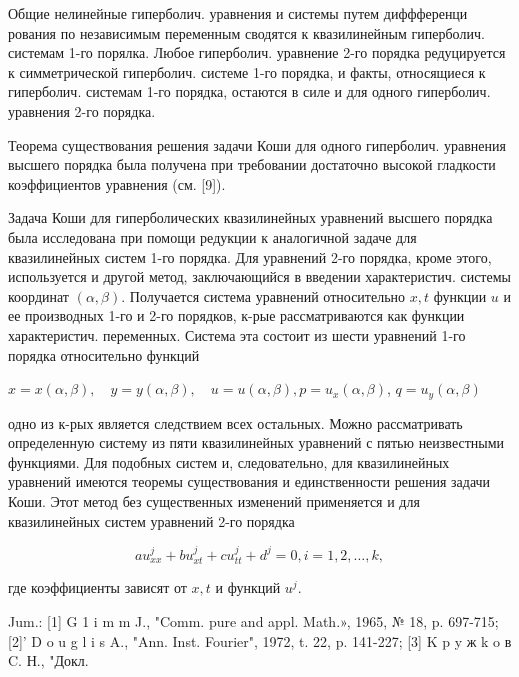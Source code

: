\documentclass[10pt]{article}
\begin{document}
Общие нелинейные гиперболич. уравнения и системы путем диффференци рования по независимым переменным сводятся к квазилинейным гиперболич. системам 1-го порялка. Любое гиперболич. уравнение 2-го порядка редуцируется к симметрической гиперболич. системе 1-го порядка, и факты, относящиеся к гиперболич. системам 1-го порядка, остаются в силе и для одного гиперболич. уравнения 2-го порядка.



Теорема существования решения задачи Коши для одного гиперболич. уравнения высшего порядка была получена при требовании достаточно высокой гладкости коэффициентов уравнения (см. [9]).



Задача Коши для гиперболических квазилинейных уравнений высшего порядка была исследована при помощи редукции к аналогичной задаче для квазилинейных систем 1-го порядка. Для уравнений 2-го порядка, кроме этого, используется и другой метод, заключающийся в введении характеристич. системы координат $(\alpha, \beta)$. Получается система уравнений относительно $x, t$ функции $u$ и ее производных 1-го и 2-го порядков, к-рые рассматриваются как функции характеристич. переменных. Система эта состоит из шести уравнений 1-го порядка относительно функций



$x=x(\alpha, \beta), \quad y=y(\alpha, \beta), \quad u=u(\alpha, \beta), p=u_{x}(\alpha, \beta)$, $q=u_{y}(\alpha, \beta)$



одно из к-рых является следствием всех остальных. Можно рассматривать определенную систему из пяти квазилинейных уравнений с пятью неизвестными функциями. Для подобных систем и, следовательно, для квазилинейных уравнений имеются теоремы существования и единственности решения задачи Коши. Этот метод без существенных изменений применяется и для квазилинейных систем уравнений 2-го порядка



\[

a u_{x x}^{j}+b u_{x t}^{j}+c u_{t t}^{j}+d^{j}=0, i=1,2, \ldots, k,

\]



где коэффициенты зависят от $x, t$ и функций $u^{j}$.



Jum.: [1] G 1 i m m J., "Comm. pure and appl. Math.», 1965, № 18, p. 697-715; [2]' D o u g l i s A., "Ann. Inst. Fourier", 1972, t. 22, p. 141-227; [3] K p y ж k o в C. Н., "Докл.
\end{document}

